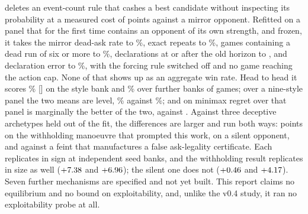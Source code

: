 deletes an event-count rule that cashes a best candidate without inspecting its
probability at a measured cost of \numStageTwoCost{} points against a mirror
opponent. Refitted on a panel that for the first time contains an opponent of its
own strength, and frozen, it takes the mirror dead-ask rate to
\numFiveDeadAsk\%, exact repeats to \numFiveRepeatAsk\%, games containing a dead
run of six or more to \numFiveDeadRunGames\%, declarations at or after the old
horizon to \numFivePostHorizonDecl{}, and declaration error to
\numFiveDeclWrong\%, with the forcing rule switched off and no game reaching the
action cap. None of that shows up as an aggregate win rate. Head to head it scores
\numPanelVfiveVfour\% [\numStyleCIVfour] on the style bank and \numHeadWin\% over
\numHeadSeeds{} further banks of \numHeadGames{} games; over a nine-style panel the two means
are level, \numVfiveMean\% against \numVfourMean\%; and on minimax regret over
that panel \vfour{} is marginally the better of the two, \numVfourRegret{}
against \numVfiveRegret{}. Against three deceptive archetypes held out of the
fit, the differences are larger and run both ways: \numDecWithholderDelta{}
points on the withholding manoeuvre that prompted this work,
\numDecSilentDelta{} on a silent opponent, and \numDecFeintDelta{} against a
feint that manufactures a false ask-legality certificate. Each replicates in
sign at \numDecSeeds{} independent seed banks, and the withholding result
replicates in size as well ($+7.38$ and
$+6.96$); the silent one does not
($+0.46$ and $+4.17$). Seven further mechanisms are specified and
not yet built. This report claims no equilibrium and no bound on exploitability,
and, unlike the v0.4 study, it ran no exploitability probe at all.
